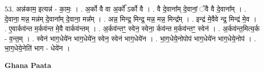 \documentclass[17pt]{extarticle}
\begin{document}
53. अन्न॑काम॒ इत्यन्न॑ - का॒मः॒ । . अ॒र्को वै वा अ॒र्को᳚ ऽर्को वै । . वै दे॒वाना᳚म् दे॒वानां॒ ॅवै वै दे॒वाना᳚म् । . दे॒वाना॒ मन्न॒ मन्न॑म् दे॒वाना᳚म् दे॒वाना॒ मन्न᳚म् । . अन्न॒ मिन्द्र॒ मिन्द्र॒ मन्न॒ मन्न॒ मिन्द्र᳚म् । . इन्द्र॑ मे॒वैवे न्द्र॒ मिन्द्र॑ मे॒व । . ए॒वार्कव॑न्त म॒र्कव॑न्त मे॒वै वार्कव॑न्तम् । . अ॒र्कव॑न्तꣳ॒॒ स्वेन॒ स्वेना॒ र्कव॑न्त म॒र्कव॑न्तꣳ॒॒ स्वेन॑ । . अ॒र्कव॑न्त॒मित्य॒र्क - व॒न्त॒म् । . स्वेन॑ भाग॒धेये॑न भाग॒धेये॑न॒ स्वेन॒ स्वेन॑ भाग॒धेये॑न । . भा॒ग॒धेये॒नोपोप॑ भाग॒धेये॑न भाग॒धेये॒नोप॑ । . भा॒ग॒धेये॒नेति॑ भाग - धेये॑न । \newline

\textbf{Ghana Paata } \newline
\end{document}
